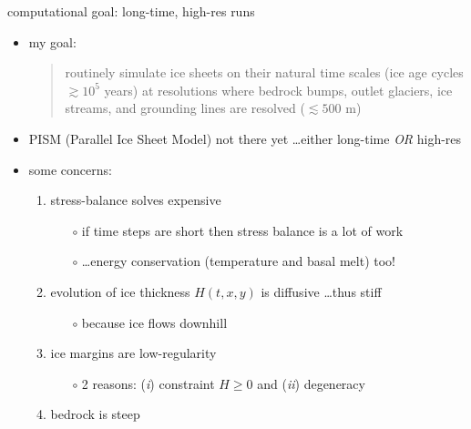 \documentclass[hide notes,intlimits,usenames,dvipsnames]{beamer}
\begin{document}
\begin{frame}{computational goal: long-time, high-res runs}

\begin{itemize}
\item my goal:
\begin{quote}
\alert{routinely} simulate ice sheets on their natural time scales (ice age cycles \alert{$\gtrsim 10^5$ years}) at resolutions where bedrock bumps, outlet glaciers, ice streams, and grounding lines are resolved (\alert{$\lesssim 500$ m})
\end{quote}

\medskip
\scriptsize
\item PISM (Parallel Ice Sheet Model) not there yet \dots either long-time \emph{OR} high-res

\medskip
\normalsize
\item some concerns:
    \begin{enumerate}
    \item stress-balance solves expensive
        \begin{itemize}
        \item[$\circ$] if time steps are short then stress balance is a lot of work
        \item[$\circ$] \dots energy conservation (temperature and basal melt) too!
        \end{itemize}
    \item evolution of ice thickness $H(t,x,y)$ is diffusive \dots thus stiff
        \begin{itemize}
        \item[$\circ$] because ice flows downhill
        \end{itemize}
    \item ice margins are low-regularity
        \begin{itemize}
        \item[$\circ$] 2 reasons: (\emph{i}) constraint $H\ge 0$ and (\emph{ii}) degeneracy
        \end{itemize}
    \item bedrock is steep
    \end{enumerate}
\end{itemize}
\end{frame}
\end{document}
